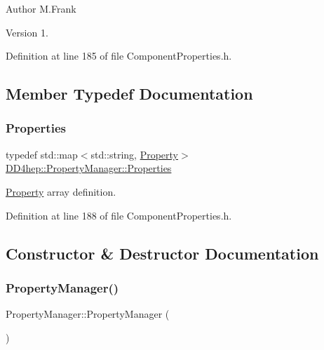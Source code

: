 \begin{DoxyAuthor}{Author}
M.\+Frank 
\end{DoxyAuthor}
\begin{DoxyVersion}{Version}
1. 
\end{DoxyVersion}


Definition at line 185 of file Component\+Properties.\+h.



\subsection{Member Typedef Documentation}
\hypertarget{class_d_d4hep_1_1_property_manager_af9bc1c909d5489219e0f9e97b16dab6f}{}\label{class_d_d4hep_1_1_property_manager_af9bc1c909d5489219e0f9e97b16dab6f} 
\subsubsection{\texorpdfstring{Properties}{Properties}}
{\footnotesize\ttfamily typedef std\+::map$<$std\+::string, \hyperlink{class_d_d4hep_1_1_property}{Property}$>$ \hyperlink{class_d_d4hep_1_1_property_manager_af9bc1c909d5489219e0f9e97b16dab6f}{D\+D4hep\+::\+Property\+Manager\+::\+Properties}}



\hyperlink{class_d_d4hep_1_1_property}{Property} array definition. 



Definition at line 188 of file Component\+Properties.\+h.



\subsection{Constructor \& Destructor Documentation}
\hypertarget{class_d_d4hep_1_1_property_manager_a3b65b75bae28db832e98a38aec5774c6}{}\label{class_d_d4hep_1_1_property_manager_a3b65b75bae28db832e98a38aec5774c6} 
\subsubsection{\texorpdfstring{Property\+Manager()}{PropertyManager()}}
{\footnotesize\ttfamily Property\+Manager\+::\+Property\+Manager (\begin{DoxyParamCaption}{ }\end{DoxyParamCaption})}



